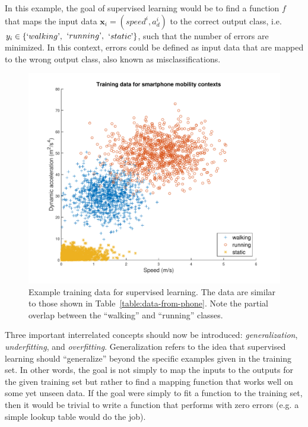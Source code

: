%
In this example, the goal of supervised learning would be to find a function $f$ that maps the input data $\mathbf{x}_i = (speed^i,a_d^i)$ to the correct output class, i.e.  $y_i \in \{`walking\textrm',$  \linebreak$`running\textrm',$ $`static\textrm'\}$, such that the number of errors are minimized. In this context, errors could be defined as input data that are mapped to the wrong output class, also known as misclassifications.
%
\begin{figure}

\begin{center}
    \includegraphics[width=1.0\textwidth]{Images/figChapter3-1}
  \end{center}
  \caption[Training data for supervised learning]{Example training data for supervised learning. The data are similar to those shown in Table~\ref{table:data-from-phone}. Note the partial overlap between the ``walking'' and ``running'' classes.}
  \label{fig:data-from-phone-supervised}
\end{figure}

Three important interrelated concepts should now be introduced: \emph{generalization}, \emph{underfitting}, and \emph{overfitting}. Generalization refers to the idea that supervised learning should ``generalize'' beyond the specific examples given in the training set. In other words, the goal is not simply to map the inputs to the outputs for the given training set but rather to find a mapping function that works well on some yet unseen data. If the goal were simply to fit a function to the training set, then it would be trivial to write a function that performs with zero errors (e.g. a simple lookup table would do the job).


